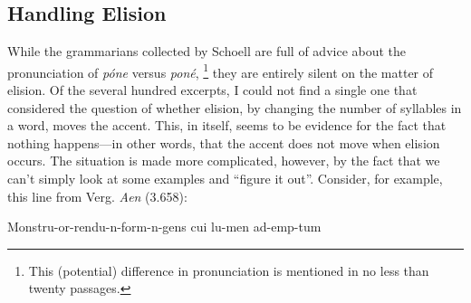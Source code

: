 \documentclass[11pt,a4paper]{scrartcl} %
\begin{document}
{\subsection{Handling Elision}

While the grammarians collected by Schoell are full of advice about the pronunciation of \textit{p\'one} versus \textit{pon\'e},%
\footnote{This (potential) difference in pronunciation is mentioned in no less than twenty passages.} they are entirely silent on the matter of elision. Of the several hundred excerpts, I could not find a single one that considered the question of whether elision, by changing the number of syllables in a word, moves the accent. This, in itself, seems to be evidence for the fact that nothing happens---in other words, that the accent does not move when elision occurs. The situation is made more complicated, however, by the fact that we can't simply look at some examples and ``figure it out''. Consider, for example, this line from Verg. \textit{Aen} (3.658):

\vspace{0.2em}
\begin{center}
        {Monstru-or-rendu-n-form-n-gens cui lu-men ad-emp-tum}
\end{center}

}
\end{document}
